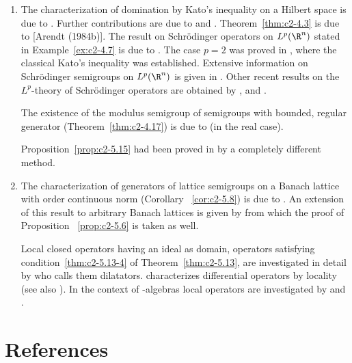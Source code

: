 \begin{enumerate}[label=\emph{Section \arabic*:}, wide]
\item  The characterization of domination by Kato's inequality on a Hilbert space is due to \textcite{simon:1977}. Further contributions are due to \textcite{hessetal:1977} and \textcite{kishimotorobinson:1980}. Theorem~\ref{thm:c2-4.3} is due to [Arendt (1984b)]. The result on Schrödinger operators on $L^p(\R^n)$ stated in Example~\ref{ex:c2-4.7} is due to \textcite{kato:1986}. The case $p = 2$ was proved in \textcite{kato:1973}, where the classical Kato's inequality was established. Extensive information on Schrödinger semigroups on $L^p(\R^n)$ is given in \textcite{simon:1982}. Other recent results on the $L^p$-theory of Schrödinger operators are obtained by \textcite{davies:1986}, \textcite{okazawa:1984} and \textcite{voigt:1984a}.

The existence of the modulus semigroup of semigroups with bounded, regular generator (Theorem~\ref{thm:c2-4.17}) is due to \textcite{derndinger:1984} (in the real case).

Proposition~\ref{prop:c2-5.15}   had been proved in \textcite{schaeferetal:1978} by a completely different method.
 
\item  
The characterization of generators of lattice semigroups on a Banach lattice with order continuous norm (Corollary ~\ref{cor:c2-5.8}) is due to \textcite{nageluhlig:1981}. An extension of this result to arbitrary Banach lattices is given by \textcite{arendt:1982} from which the proof of  Proposition ~\ref{prop:c2-5.6}   is taken as well.

Local closed operators having an ideal as domain, \ie operators satisfying condition~\ref{thm:c2-5.13-4} of Theorem~\ref{thm:c2-5.13}, are investigated in detail by \textcite{nakano:1950} who calls them dilatators. \textcite{peetre:1959} characterizes differential operators by locality (see also \textcite{luxemburg:1979}). In the context of \CA-algebras local operators are investigated by \textcite{battyrobinson:1984} and \textcite{battyrobinson:1985}.

\end{enumerate}
\section*{References}
{\RaggedRight
  \printbibliography[heading=none]
 }
